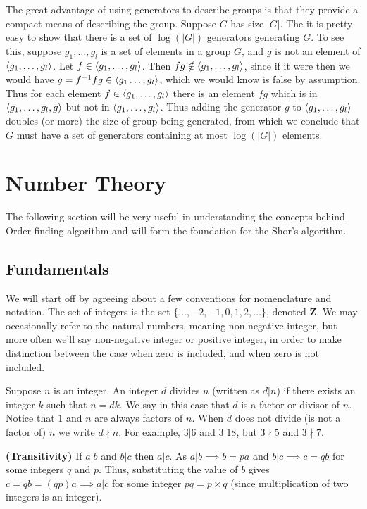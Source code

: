 The great advantage of using generators to describe groups is that they provide a compact means of describing the group. Suppose $G$ has size $|G|$. The it is pretty easy to show that there is a set of $\log(|G|)$ generators generating $G$. To see this, suppose $g_1,\ldots,g_l$ is a set of elements in a group $G$, and $g$ is not an element of $\braket{g_1,\ldots,g_l}$. Let $f \in\braket{g_1,\ldots,g_l}$. Then $fg\notin \braket{g_1,\ldots,g_l}$, since if it were then we would have $g=f^{-1}fg \in \braket{g_1\ldots,g_l}$, which we would know is false by assumption. Thus for each element $f \in \braket{g_1,\ldots,g_l}$ there is an element $fg$ which is in $\braket{g_1,\ldots,g_l,g}$ but not in $\braket{g_1,\ldots,g_l}$. Thus adding the generator $g$ to $\braket{g_1,\ldots,g_l}$ doubles (or more) the size of group being generated, from which we conclude that $G$ must have a set of generators containing at most $\log(|G|)$ elements.



\section{Number Theory}
The following section will be very useful in understanding the concepts behind Order finding algorithm and will form the foundation for the Shor's algorithm.

\subsection{Fundamentals}
We will start off by agreeing about a few conventions for nomenclature and notation. The set of integers is the set $\{\ldots,-2,-1,0,1,2,\ldots\}$, denoted $\mathbf{Z}$. We may occasionally refer to the natural numbers, meaning non-negative integer, but more often we'll say non-negative integer or positive integer, in order to make distinction between the case when zero is included, and when zero is not included.

Suppose $n$ is an integer. An integer $d$ divides $n$ (written as $d|n$) if there exists an integer $k$ such that $n=dk$. We say in this case that $d$ is a factor or divisor of $n$. Notice that $1$ and $n$ are always factors of $n$. When $d$ does not divide (is not a factor of) $n$ we write $d\nmid n$. For example, $3|6$ and $3|18$, but $3\nmid 5$ and $3\nmid 7$.

\begin{example}
    \textbf{(Transitivity)} If $a|b$ and $b|c$ then $a|c$. As $a|b \implies b=pa$ and $b|c \implies c=qb$ for some integers $q$ and $p$. Thus, substituting the value of $b$ gives $c=qb=(qp)a \implies a|c$ for some integer $pq = p\times q$ (since multiplication of two integers is an integer).
\end{example}

